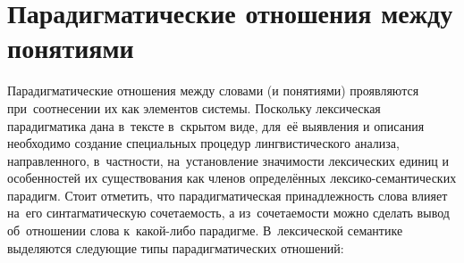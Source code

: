 \documentclass[12pt]{article}
\theoremstyle{definition}
\theoremstyle{remark}
\numberwithin{equation}{section}
\begin{document}
\section{Парадигматические отношения между понятиями}
Парадигматические отношения между словами (и понятиями) проявляются
при~соотнесении их как элементов системы. Поскольку лексическая
парадигматика дана в~тексте в~скрытом виде, для~её выявления
и описания необходимо создание специальных процедур лингвистического
анализа, направленного, в~частности, на~установление значимости
лексических единиц и особенностей их существования как членов
определённых лексико-семантических парадигм. Стоит отметить, что
парадигматическая принадлежность слова влияет на~его синтагматическую
сочетаемость, а из~сочетаемости можно сделать вывод об~отношении
слова к~какой-либо парадигме. В~лексической семантике выделяются
следующие типы парадигматических отношений:
\end{document}
